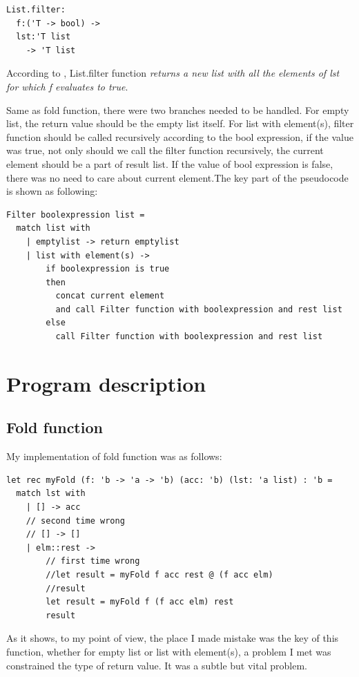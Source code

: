 \lstset{language=Csh}
\begin{lstlisting}
List.filter: 
  f:('T -> bool) -> 
  lst:'T list 
    -> 'T list
\end{lstlisting}

According to \cite{sporring2019}, List.filter function \emph{returns a new list with all the elements of lst for which f evaluates to true}. 

Same as fold function, there were two branches needed to be handled. For empty list, the return value should be the empty list itself. For list with element(s), filter function should be called recursively according to the bool expression, if the value was true, not only should we call the filter function recursively, the current element should be a part of result list. If the value of bool expression is false, there was no need to care about current element.The key part of the pseudocode is shown as following:

\begin{lstlisting}
Filter boolexpression list =
  match list with
    | emptylist -> return emptylist
    | list with element(s) -> 
        if boolexpression is true
        then
          concat current element 
          and call Filter function with boolexpression and rest list
        else
          call Filter function with boolexpression and rest list  

\end{lstlisting}

\section{Program description}

\subsection{Fold function}

My implementation of fold function was as follows:

\begin{lstlisting}
let rec myFold (f: 'b -> 'a -> 'b) (acc: 'b) (lst: 'a list) : 'b =
  match lst with
    | [] -> acc
    // second time wrong
    // [] -> []
    | elm::rest -> 
        // first time wrong
        //let result = myFold f acc rest @ (f acc elm)
        //result
        let result = myFold f (f acc elm) rest
        result
\end{lstlisting}

As it shows, to my point of view, the place I made mistake was the key of this function, whether for empty list or list with element(s), a problem I met was constrained the type of return value. It was a subtle but vital problem.

